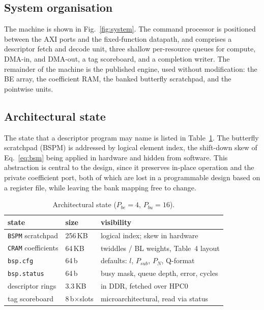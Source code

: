 \documentclass[twocolumn,10pt]{article}
\newcommand{\Pbu}{P_{bu}}
\newcommand{\Pbe}{P_{be}}
\newcommand{\Psub}{P_{sub}}
\newcommand{\PN}{P_{N}}
\begin{document}
\subsection{System organisation}
The machine is shown in Fig.~\ref{fig:system}.  The command processor is
positioned between the AXI ports and the fixed-function datapath, and comprises
a descriptor fetch and decode unit, three shallow per-resource queues for
compute, DMA-in, and DMA-out, a tag scoreboard, and a completion writer.  The
remainder of the machine is the published engine, used without modification: the
BE array, the coefficient RAM, the banked butterfly scratchpad, and the
pointwise units.

\subsection{Architectural state}
The state that a descriptor program may name is listed in Table~\ref{tab:state}.
The butterfly scratchpad (BSPM) is addressed by logical element index, the
shift-down skew of Eq.~\ref{eq:bsm} being applied in hardware and hidden from
software.  This abstraction is central to the design, since it preserves
in-place operation and the private coefficient port, both of which are lost in a
programmable design based on a register file, while leaving the bank mapping
free to change.

\begin{table}[t]
\centering\small
\caption{Architectural state ($\Pbe{=}4$, $\Pbu{=}16$).}
\label{tab:state}
\setlength{\tabcolsep}{3.5pt}
\begin{tabular}{@{}lll@{}}
\toprule
state & size & visibility \\
\midrule
\texttt{BSPM} scratchpad & 256\,KB & logical index; skew in hardware \\
\texttt{CRAM} coefficients & 64\,KB & twiddles / BL weights, Table~4 layout \\
\texttt{bsp.cfg} & 64\,b & defaults: $l$, $\Psub$, $\PN$, Q-format \\
\texttt{bsp.status} & 64\,b & busy mask, queue depth, error, cycles \\
descriptor rings & 3.3\,KB & in DDR, fetched over HPC0 \\
tag scoreboard & 8\,b$\times$slots & microarchitectural, read via status \\
\bottomrule
\end{tabular}
\end{table}
\end{document}
